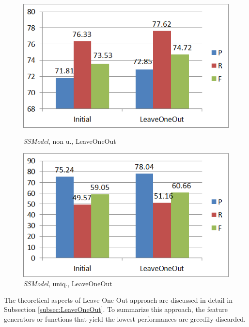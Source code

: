 \begin{figure}
\centering
\begin{minipage}{.5\textwidth}
  \centering
  \includegraphics[width=.95\textwidth]{figures/LeaveOneOutNUniq.png}
  \caption{\textit{SSModel}, non u., LeaveOneOut}
  \label{fig:LeaveOO_NU}
\end{minipage}%
\begin{minipage}{.5\textwidth}
  \centering
  \includegraphics[width=.95\textwidth]{figures/LeaveOneOutUniq.png}
  \caption{\textit{SSModel}, uniq., LeaveOneOut}
  \label{fig:LeaveOO_U}
\end{minipage}
\end{figure}

The theoretical aspects of Leave-One-Out approach are discussed in detail in Subsection \ref{subsec:LeaveOneOut}. To summarize this approach, the feature generators or functions that yield the lowest performances are greedily discarded.

